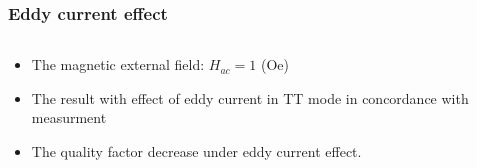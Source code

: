 \documentclass[compress]{beamer}
\begin{document}
\begin{frame}\frametitle{Eddy current effect}
\begin{columns}[totalwidth=\textwidth]
 \begin{column}{.59\textwidth}
\begin{itemize}[label=$\bullet$, font=\small, leftmargin=*]
\item The magnetic external field: $H_{ac}=1$ (Oe)
\item The result with effect of eddy current in TT mode in concordance with measurment 
\item The quality factor decrease under eddy current effect.

\end{itemize}
\end{column}
\end{columns}
\end{frame}
\end{document}
